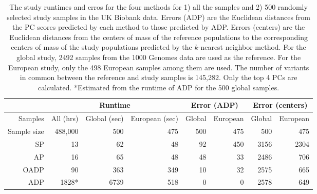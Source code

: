 \documentclass{article}
\begin{document}
\begin{table}[H]
  \centering
  \begin{tabular}{|r|r|r|r|r|r|r|r|}
    \hline
    & \multicolumn{3}{|c|}{Runtime} & \multicolumn{2}{|c|}{Error (ADP)} & \multicolumn{2}{|c|}{Error (centers)} \\
    \hline
    Samples & All (hrs) & Global (sec) & European (sec) & Global & European & Global & European \\
    \hline
    Sample size & 488,000 & 500 & 475 & 500 & 475 & 500 & 475 \\
    \hline
    SP   & 13    &  62   & 48  & 92  & 450 & 3156 & 2304 \\ 
    AP   & 16    &  65   & 48  & 48  & 33  & 2486 & 706  \\
    OADP & 90    &  363  & 349 & 10  & 32  & 2575 & 665  \\
    ADP  & 1828*  &  6739 & 518 & 0   & 0   & 2578 & 649  \\
    \hline
  \end{tabular}
  \caption{
    The study runtimes and erros for the four methods
    for 1) all the samples and 2) 500 randomly selected study samples
    in the UK Biobank data.
    Errors (ADP) are the Euclidean distances from
    the PC scores predicted by each method
    to those predicted by ADP.
    Errors (centers) are the Euclidean distances
    from the centers of mass of the reference populations
    to the corresponding centers of mass of the study populations
    predicted by the $k$-nearest neighbor method.
    For the global study,
    2492 samples from the 1000 Genomes data are used as the reference.
    For the European study,
    only the 498 European samples among them are used.
    The number of variants
    in common between the reference and study samples is 145,282.
    Only the top 4 PCs are calculated.
    *Estimated from the runtime of ADP for the 500 global samples.
    }
    \label{tbl:ukb}
\end{table}
\end{document}
